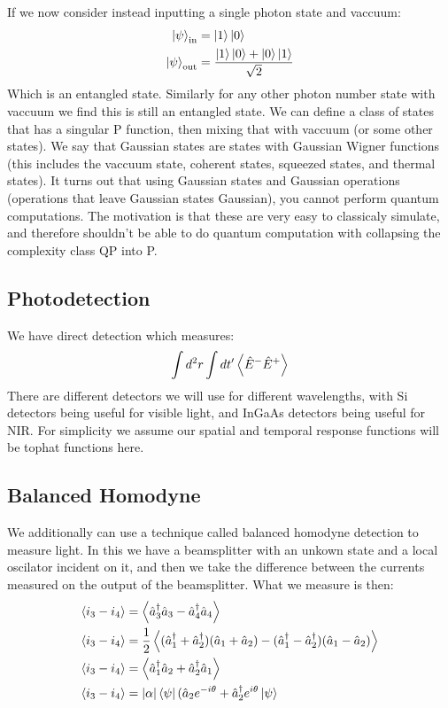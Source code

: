 If we now consider instead inputting a single photon state and vaccuum:
\begin{align*}
	\ket{\psi}_\text{in} &= \ket{1}\ket{0} \\
	\ket{\psi}_\text{out} &= \frac{\ket{1}\ket{0} + \ket{0}\ket{1}}{\sqrt{2}}
\end{align*}
Which is an entangled state. Similarly for any other photon number state with vaccuum we find this is still an entangled state.
We can define a class of states that has a singular P function, then mixing that with vaccuum (or some other states).
We say that Gaussian states are states with Gaussian Wigner functions (this includes the vaccuum state, coherent states, squeezed states, and thermal states).
It turns out that using Gaussian states and Gaussian operations (operations that leave Gaussian states Gaussian), you cannot perform quantum computations.
The motivation is that these are very easy to classicaly simulate, and therefore shouldn't be able to do quantum computation with collapsing the complexity class QP into P.

\subsection{Photodetection}
We have direct detection which measures:
\begin{align*}
	\int d^2 r \int dt' \expval{\hat{E}^-\hat{E}^+}
\end{align*}
There are different detectors we will use for different wavelengths, with Si detectors being useful for visible light, and InGaAs detectors being useful for NIR.
For simplicity we assume our spatial and temporal response functions will be tophat functions here.

\subsection{Balanced Homodyne}
We additionally can use a technique called balanced homodyne detection to measure light.
In this we have a beamsplitter with an unkown state and a local oscilator incident on it, and then we take the difference between the currents measured on the output of the beamsplitter. What we measure is then:
\begin{align*}
	\expval{i_3  - i_4} &= \expval{\hat{a}_3^\dagger\hat{a}_3 - \hat{a}_4^\dagger\hat{a}_4} \\
	\expval{i_3  - i_4} &= \frac{1}{2}\expval{(\hat{a}_1^\dagger +\hat{a}_2^\dagger)(\hat{a}_1 + \hat{a}_2) - (\hat{a}_1^\dagger - \hat{a}_2^\dagger)(\hat{a}_1 - \hat{a}_2)} \\
	\expval{i_3  - i_4} &= \expval{\hat{a}_1^\dagger\hat{a}_2 + \hat{a}_2^\dagger\hat{a}_1} \\
	\expval{i_3  - i_4} &= |\alpha| \bra{\psi}(\hat{a}_2 e^{-i\theta} + \hat{a}_2^\dagger e^{i\theta}\ket{\psi}
\end{align*}
